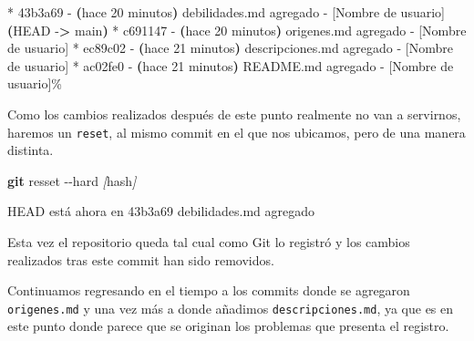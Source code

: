\documentclass[
]{book}
\newenvironment{Shaded}{\begin{snugshade}}{\end{snugshade}}
\newcommand{\AttributeTok}[1]{\textcolor[rgb]{0.13,0.29,0.53}{#1}}
\newcommand{\ErrorTok}[1]{\textcolor[rgb]{0.64,0.00,0.00}{\textbf{#1}}}
\newcommand{\ExtensionTok}[1]{#1}
\newcommand{\FunctionTok}[1]{\textcolor[rgb]{0.13,0.29,0.53}{\textbf{#1}}}
\newcommand{\KeywordTok}[1]{\textcolor[rgb]{0.13,0.29,0.53}{\textbf{#1}}}
\newcommand{\NormalTok}[1]{#1}
\newcommand{\OperatorTok}[1]{\textcolor[rgb]{0.81,0.36,0.00}{\textbf{#1}}}
\newcommand{\PreprocessorTok}[1]{\textcolor[rgb]{0.56,0.35,0.01}{\textit{#1}}}
\newcommand{\SpecialStringTok}[1]{\textcolor[rgb]{0.31,0.60,0.02}{#1}}
\begin{document}
\begin{Shaded}
\begin{Highlighting}[]
\ExtensionTok{*}\NormalTok{ 43b3a69 }\AttributeTok{{-}} \ErrorTok{(}\ExtensionTok{hace}\NormalTok{ 20 minutos}\KeywordTok{)} \ExtensionTok{debilidades.md}\NormalTok{ agregado }\AttributeTok{{-}}\NormalTok{ [Nombre de usuario] }\ErrorTok{(}\ExtensionTok{HEAD} \AttributeTok{{-}}\OperatorTok{\textgreater{}}\NormalTok{ main}\KeywordTok{)}
\ExtensionTok{*}\NormalTok{ c691147 }\AttributeTok{{-}} \ErrorTok{(}\ExtensionTok{hace}\NormalTok{ 20 minutos}\KeywordTok{)} \ExtensionTok{origenes.md}\NormalTok{ agregado }\AttributeTok{{-}}\NormalTok{ [Nombre de usuario]}
\ExtensionTok{*}\NormalTok{ ec89c02 }\AttributeTok{{-}} \ErrorTok{(}\ExtensionTok{hace}\NormalTok{ 21 minutos}\KeywordTok{)} \ExtensionTok{descripciones.md}\NormalTok{ agregado }\AttributeTok{{-}}\NormalTok{ [Nombre de usuario]}
\ExtensionTok{*}\NormalTok{ ac02fe0 }\AttributeTok{{-}} \ErrorTok{(}\ExtensionTok{hace}\NormalTok{ 21 minutos}\KeywordTok{)} \ExtensionTok{README.md}\NormalTok{ agregado }\AttributeTok{{-}}\NormalTok{ [Nombre de usuario]\%   }
\end{Highlighting}
\end{Shaded}

Como los cambios realizados después de este punto realmente no van a servirnos, haremos un \texttt{reset}, al mismo commit en el que nos ubicamos, pero de una manera distinta.

\begin{Shaded}
\begin{Highlighting}[]
\FunctionTok{git}\NormalTok{ resset }\AttributeTok{{-}{-}hard} \PreprocessorTok{[}\SpecialStringTok{hash}\PreprocessorTok{]}
\end{Highlighting}
\end{Shaded}

\begin{Shaded}
\begin{Highlighting}[]
\ExtensionTok{HEAD}\NormalTok{ está ahora en 43b3a69 debilidades.md agregado}
\end{Highlighting}
\end{Shaded}

Esta vez el repositorio queda tal cual como Git lo registró y los cambios realizados tras este commit han sido removidos.

Continuamos regresando en el tiempo a los commits donde se agregaron \texttt{origenes.md} y una vez más a donde añadimos \texttt{descripciones.md}, ya que es en este punto donde parece que se originan los problemas que presenta el registro.
\end{document}
